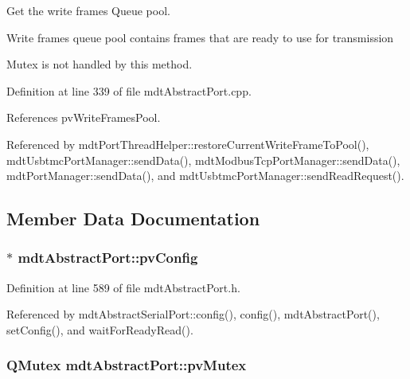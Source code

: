 Get the write frames Queue pool. 

Write frames queue pool contains frames that are ready to use for transmission

Mutex is not handled by this method. 

Definition at line 339 of file mdt\-Abstract\-Port.\-cpp.



References pv\-Write\-Frames\-Pool.



Referenced by mdt\-Port\-Thread\-Helper\-::restore\-Current\-Write\-Frame\-To\-Pool(), mdt\-Usbtmc\-Port\-Manager\-::send\-Data(), mdt\-Modbus\-Tcp\-Port\-Manager\-::send\-Data(), mdt\-Port\-Manager\-::send\-Data(), and mdt\-Usbtmc\-Port\-Manager\-::send\-Read\-Request().



\subsection{Member Data Documentation}
\hypertarget{classmdt_abstract_port_a035d72bddbac47f405a8ecf0d2eeba66}{
\subsubsection[{pv\-Config}]{$\ast$ mdt\-Abstract\-Port\-::pv\-Config\hspace{0.3cm}{\ttfamily [protected]}}}\label{classmdt_abstract_port_a035d72bddbac47f405a8ecf0d2eeba66}


Definition at line 589 of file mdt\-Abstract\-Port.\-h.



Referenced by mdt\-Abstract\-Serial\-Port\-::config(), config(), mdt\-Abstract\-Port(), set\-Config(), and wait\-For\-Ready\-Read().

\hypertarget{classmdt_abstract_port_a357bce65bc031fffa87090a26ab88a08}{
\subsubsection[{pv\-Mutex}]{\setlength{\rightskip}{0pt plus 5cm}Q\-Mutex mdt\-Abstract\-Port\-::pv\-Mutex\hspace{0.3cm}{\ttfamily [protected]}}}\label{classmdt_abstract_port_a357bce65bc031fffa87090a26ab88a08}


